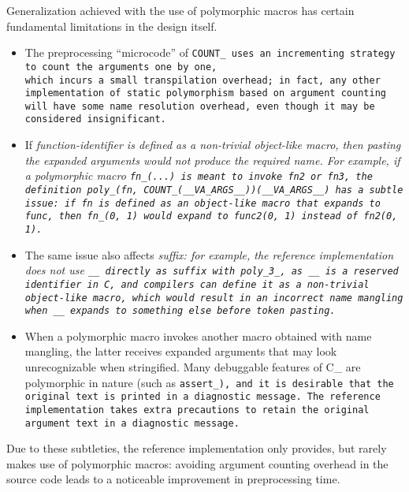 Generalization achieved with the use of polymorphic macros
has certain fundamental limitations in the design itself.

\begin{itemize}[nosep]

\item The preprocessing ``microcode'' of \tt{COUNT_} uses an
incrementing strategy to count the arguments one by one,\\
which incurs a small transpilation overhead; in fact, any other implementation
of static polymorphism based on argument counting will have some name
resolution overhead, even though it may be considered insignificant.

\item If \it{function-identifier} is defined as a non-trivial object-like macro,
then pasting the expanded arguments would not produce the required name.
For example, if a polymorphic macro \tt{fn_(...)} is meant to invoke \tt{fn2}
or \tt{fn3}, the definition \tt{poly_(fn, COUNT_(__VA_ARGS__))(__VA_ARGS__)}
has a subtle issue: if \tt{fn} is defined as an object-like
macro that expands to \tt{func}, then \tt{fn_(0, 1)} would
expand to \tt{func2(0, 1)} instead of \tt{fn2(0, 1)}.

\item The same issue also affects \it{suffix}: for example, the reference
implementation does not use \tt{__} directly as \it{suffix} with \tt{poly_3_},
as \tt{__} is a reserved identifier in C, and compilers can define it
as a non-trivial object-like macro, which would result in an incorrect
name mangling when \tt{__} expands to something else before token pasting.

\item When a polymorphic macro invokes another macro
obtained with name mangling, the latter receives expanded
arguments that may look unrecognizable when stringified.
Many debuggable features of C\_ are polymorphic in nature (such as \tt{assert_}),
and it is desirable that the original text is printed in a diagnostic message.
The reference implementation takes extra precautions to
retain the original argument text in a diagnostic message.

\end{itemize}

Due to these subtleties, the reference implementation only provides, but rarely
makes use of polymorphic macros: avoiding argument counting overhead in
the source code leads to a noticeable improvement in preprocessing time.
